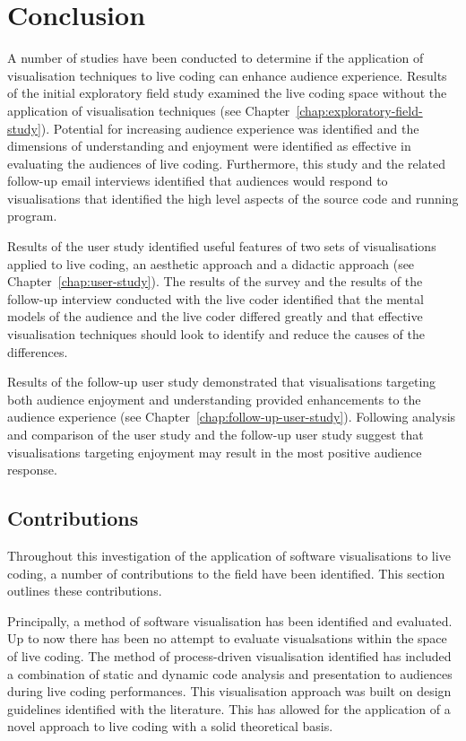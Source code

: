 
\chapter{Conclusion}
\label{chap:conclusion}

A number of studies have been conducted to determine if the application of visualisation techniques to live coding can enhance audience experience. Results of the initial exploratory field study examined the live coding space without the application of visualisation techniques (see Chapter~\ref{chap:exploratory-field-study}). Potential for increasing audience experience was identified and the dimensions of understanding and enjoyment were identified as effective in evaluating the audiences of live coding. Furthermore, this study and the related follow-up email interviews identified that audiences would respond to visualisations that identified the high level aspects of the source code and running program.

Results of the user study identified useful features of two sets of visualisations applied to live coding, an aesthetic approach and a didactic approach (see Chapter~\ref{chap:user-study}). The results of the survey and the results of the follow-up interview conducted with the live coder identified that the mental models of the audience and the live coder differed greatly and that effective visualisation techniques should look to identify and reduce the causes of the differences.

Results of the follow-up user study demonstrated that visualisations targeting  both audience enjoyment and understanding provided enhancements to the audience experience (see Chapter~\ref{chap:follow-up-user-study}). Following analysis and comparison of the user study and the follow-up user study suggest that visualisations targeting enjoyment may result in the most positive audience response.

\section{Contributions}

Throughout this investigation of the application of software visualisations to live coding, a number of contributions to the field have been identified. This section outlines these contributions.

Principally, a method of software visualisation has been identified and evaluated. Up to now there has been no attempt to evaluate visualsations within the space of live coding. The method of process-driven visualisation identified has included a combination of static and dynamic code analysis and presentation to audiences during live coding performances. This visualisation approach was built on design guidelines identified with the literature. This has allowed for the application of a novel approach to live coding with a solid theoretical basis.

